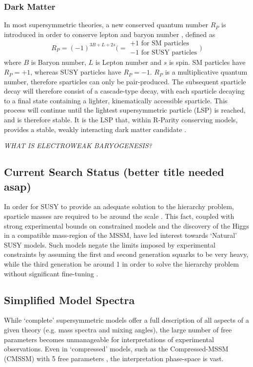\subsubsection{Dark Matter}
In most supersymmetric theories, a new conserved quantum number $R_P$
is introduced in order to conserve lepton and baryon number
\cite{Farrar1978575}, defined as
% 
\begin{equation}
R_P = (-1)^{3B+L+2s} \Bigg( =
\begin{array}{l} 
+1 \text{ for SM particles}\\ -1 \text{ for SUSY particles}
\end{array}\Bigg)
\end{equation}
% 
where $B$ is Baryon number, $L$ is Lepton number and $s$ is spin. SM particles
have $R_P = +1$, whereas SUSY particles have $R_P = -1$. $R_P$ is a
multiplicative quantum number, therefore sparticles
can only be pair-produced. The subsequent sparticle decay will therefore consist
of a cascade-type decay, with each sparticle decaying to a final state
containing a lighter, kinematically accessible sparticle. This process will
continue until the lightest supersymmetric particle (LSP) is reached, and is
therefore stable. It is the LSP that, within R-Parity conserving models,
provides a stable, weakly interacting dark matter candidate
\cite{Jungman:1995df}.

\emph{WHAT IS ELECTROWEAK BARYOGENESIS?}

\subsection{Current Search Status (better title needed asap)}
In order for SUSY to provide an adequate solution to the hierarchy problem,
sparticle masses are required to be around the \tev scale
\cite{ref:barbierinsusy,ref:hierarchy1,ref:hierarchy2}. This fact, coupled
with strong experimental bounds on constrained models and the discovery of
the Higgs in a compatible mass-region of the MSSM, have led interest
towards `Natural' SUSY models. Such models negate the limits imposed by
experimental constraints by assuming the first and second generation squarks to
be very heavy, while the third generation be around 1 \tev in order to solve
the hierarchy problem without significant fine-tuning \cite{Carena:2008rt}.

\subsection{Simplified Model Spectra}
While `complete' supersymmetric models offer a full description of all
aspects of a given theory (e.g. mass spectra and mixing angles), the large
number of free parameters becomes unmanageable for interpretations
of experimental observations. Even in `compressed' models, such as the
Compressed-MSSM (CMSSM) with 5
free parameters \cite{Kane:1993td}, the interpretation phase-space is vast.

